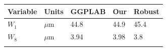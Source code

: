 \documentclass[
]{article}
\begin{document}
\begin{longtable}[]{@{}lllll@{}}
\toprule
\begin{minipage}[b]{0.25\columnwidth}\raggedright
Variable\strut
\end{minipage} & \begin{minipage}[b]{0.15\columnwidth}\raggedright
Units\strut
\end{minipage} & \begin{minipage}[b]{0.18\columnwidth}\raggedright
GGPLAB\strut
\end{minipage} & \begin{minipage}[b]{0.13\columnwidth}\raggedright
Our\strut
\end{minipage} & \begin{minipage}[b]{0.15\columnwidth}\raggedright
Robust\strut
\end{minipage}\tabularnewline
\midrule
\endhead
\begin{minipage}[t]{0.25\columnwidth}\raggedright
\(W_1\)\strut
\end{minipage} & \begin{minipage}[t]{0.15\columnwidth}\raggedright
\(\mu\)m\strut
\end{minipage} & \begin{minipage}[t]{0.18\columnwidth}\raggedright
44.8\strut
\end{minipage} & \begin{minipage}[t]{0.13\columnwidth}\raggedright
44.9\strut
\end{minipage} & \begin{minipage}[t]{0.15\columnwidth}\raggedright
45.4\strut
\end{minipage}\tabularnewline
\begin{minipage}[t]{0.25\columnwidth}\raggedright
\(W_8\)\strut
\end{minipage} & \begin{minipage}[t]{0.15\columnwidth}\raggedright
\(\mu\)m\strut
\end{minipage} & \begin{minipage}[t]{0.18\columnwidth}\raggedright
3.94\strut
\end{minipage} & \begin{minipage}[t]{0.13\columnwidth}\raggedright
3.98\strut
\end{minipage} & \begin{minipage}[t]{0.15\columnwidth}\raggedright
3.8\strut
\end{minipage}\tabularnewline
\begin{minipage}[t]{0.25\columnwidth}\raggedright

\end{minipage}
\end{longtable}
\end{document}
